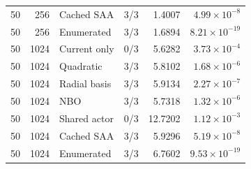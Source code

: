 \begin{longtable}{rrlrrr}
50 & 256 & Cached SAA & 3/3 & 1.4007 & $4.99\times10^{-8}$\\
50 & 256 & Enumerated & 3/3 & 1.6894 & $8.21\times10^{-19}$\\
50 & 1024 & Current only & 0/3 & 5.6282 & $3.73\times10^{-4}$\\
50 & 1024 & Quadratic & 3/3 & 5.8102 & $1.68\times10^{-6}$\\
50 & 1024 & Radial basis & 3/3 & 5.9134 & $2.27\times10^{-7}$\\
50 & 1024 & NBO & 3/3 & 5.7318 & $1.32\times10^{-6}$\\
50 & 1024 & Shared actor & 0/3 & 12.7202 & $1.12\times10^{-3}$\\
50 & 1024 & Cached SAA & 3/3 & 5.9296 & $5.19\times10^{-8}$\\
50 & 1024 & Enumerated & 3/3 & 6.7602 & $9.53\times10^{-19}$\\
\bottomrule
\end{longtable}
